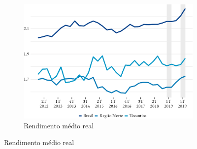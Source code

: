 \begin{figure}[!h]
	\begin{subfigure}{\linewidth}
		\caption{Rendimento médio real}
		\includegraphics{fig/rend_medio-1.pdf}
	\end{subfigure}
\end{figure}
